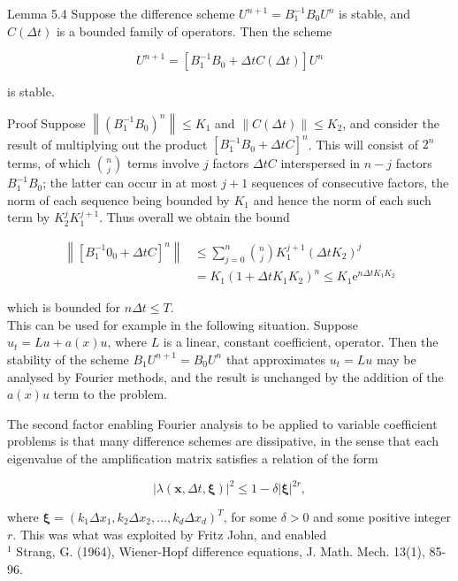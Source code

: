 \documentclass[10pt]{article}
\begin{document}
Lemma 5.4 Suppose the difference scheme \(U^{n+1}=B_{1}^{-1} B_{0} U^{n}\) is stable, and \(C(\Delta t)\) is a bounded family of operators. Then the scheme

\[
U^{n+1}=\left[B_{1}^{-1} B_{0}+\Delta t C(\Delta t)\right] U^{n}
\]

is stable.

Proof Suppose \(\left\|\left(B_{1}^{-1} B_{0}\right)^{n}\right\| \leq K_{1}\) and \(\|C(\Delta t)\| \leq K_{2}\), and consider the result of multiplying out the product \(\left[B_{1}^{-1} B_{0}+\Delta t C\right]^{n}\). This will consist of \(2^{n}\) terms, of which \(\binom{n}{j}\) terms involve \(j\) factors \(\Delta t C\) interspersed in \(n-j\) factors \(B_{1}^{-1} B_{0}\); the latter can occur in at most \(j+1\) sequences of consecutive factors, the norm of each sequence being bounded by \(K_{1}\) and hence the norm of each such term by \(K_{2}^{j} K_{1}^{j+1}\). Thus overall we obtain the bound

\[
\begin{aligned}
\left\|\left[B_{1}^{-1} 0_{0}+\Delta t C\right]^{n}\right\| & \leq \sum_{j=0}^{n}\binom{n}{j} K_{1}^{j+1}\left(\Delta t K_{2}\right)^{j} \\
& =K_{1}\left(1+\Delta t K_{1} K_{2}\right)^{n} \leq K_{1} \mathrm{e}^{n \Delta t K_{1} K_{2}}
\end{aligned}
\]

which is bounded for \(n \Delta t \leq T\).\\
This can be used for example in the following situation. Suppose \(u_{t}=L u+a(x) u\), where \(L\) is a linear, constant coefficient, operator. Then the stability of the scheme \(B_{1} U^{n+1}=B_{0} U^{n}\) that approximates \(u_{t}=L u\) may be analysed by Fourier methods, and the result is unchanged by the addition of the \(a(x) u\) term to the problem.

The second factor enabling Fourier analysis to be applied to variable coefficient problems is that many difference schemes are dissipative, in the sense that each eigenvalue of the amplification matrix satisfies a relation of the form

\[
|\lambda(\boldsymbol{x}, \Delta t, \boldsymbol{\xi})|^{2} \leq 1-\delta|\boldsymbol{\xi}|^{2 r},
\]

where \(\boldsymbol{\xi}=\left(k_{1} \Delta x_{1}, k_{2} \Delta x_{2}, \ldots, k_{d} \Delta x_{d}\right)^{T}\), for some \(\delta>0\) and some positive integer \(r\). This was what was exploited by Fritz John, and enabled\\
\({ }^{1}\) Strang, G. (1964), Wiener-Hopf difference equations, J. Math. Mech. 13(1), 85-96.
\end{document}
